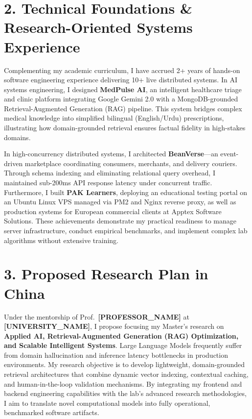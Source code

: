 \documentclass[10pt,a4paper]{article}
\begin{document}
\section{2. Technical Foundations \& Research-Oriented Systems Experience}
Complementing my academic curriculum, I have accrued 2+ years of hands-on software engineering experience delivering 10+ live distributed systems. In AI systems engineering, I designed \textbf{MedPulse AI}, an intelligent healthcare triage and clinic platform integrating Google Gemini 2.0 with a MongoDB-grounded Retrieval-Augmented Generation (RAG) pipeline. This system bridges complex medical knowledge into simplified bilingual (English/Urdu) prescriptions, illustrating how domain-grounded retrieval ensures factual fidelity in high-stakes domains.

In high-concurrency distributed systems, I architected \textbf{BeanVerse}---an event-driven marketplace coordinating consumers, merchants, and delivery couriers. Through schema indexing and eliminating relational query overhead, I maintained sub-200ms API response latency under concurrent traffic. Furthermore, I built \textbf{PAK Learners}, deploying an educational testing portal on an Ubuntu Linux VPS managed via PM2 and Nginx reverse proxy, as well as production systems for European commercial clients at Apptex Software Solutions. These achievements demonstrate my practical readiness to manage server infrastructure, conduct empirical benchmarks, and implement complex lab algorithms without extensive training.

\section{3. Proposed Research Plan in China}
Under the mentorship of Prof.~\textbf{[PROFESSOR\_NAME]} at \textbf{[UNIVERSITY\_NAME]}, I propose focusing my Master’s research on \textbf{Applied AI, Retrieval-Augmented Generation (RAG) Optimization, and Scalable Intelligent Systems}. Large Language Models frequently suffer from domain hallucination and inference latency bottlenecks in production environments. My research objective is to develop lightweight, domain-grounded retrieval architectures that combine dynamic vector indexing, contextual caching, and human-in-the-loop validation mechanisms. By integrating my frontend and backend engineering capabilities with the lab's advanced research methodologies, I aim to translate novel computational models into fully operational, benchmarked software artifacts.
\end{document}
